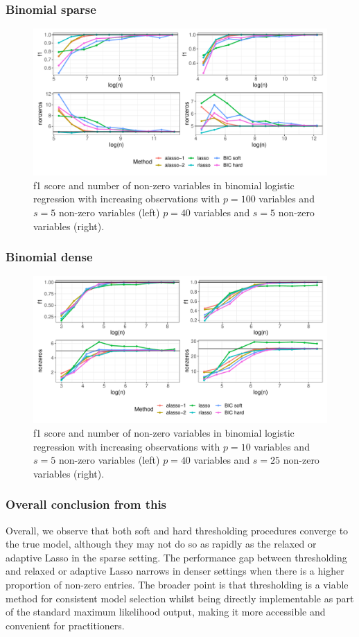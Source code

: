 \documentclass{beamer}
\begin{document}
\begin{frame}
  \frametitle{Binomial sparse}
  \begin{figure}[h!]
    \centering
    \includegraphics[scale=0.4]{binomial_sparse.pdf}
    \caption{{\footnotesize f1 score and number of non-zero variables in binomial logistic regression with increasing observations with $p=100$ variables and $s=5$ non-zero variables (left) $p=40$ variables and $s=5$ non-zero variables (right).}}
  \end{figure}


\end{frame}

\begin{frame}
  \frametitle{Binomial dense}
  \begin{figure}[h!]
    \centering
    \includegraphics[scale=0.4]{binomial_dense.pdf}
      \caption{{\footnotesize f1 score and number of non-zero variables in binomial logistic regression with increasing observations with $p=10$ variables and $s=5$ non-zero variables (left) $p=40$ variables and $s=25$ non-zero variables (right).}}
  \end{figure}
\end{frame}

\begin{frame}
  \frametitle{Overall conclusion from this}
  Overall, we observe that both soft and hard thresholding procedures converge to the true model, although they may not do so as rapidly as the relaxed or adaptive Lasso in the sparse setting. The performance gap between thresholding and relaxed or adaptive Lasso narrows in denser settings when there is a higher proportion of non-zero entries. The broader point is that thresholding is a viable method for consistent model selection whilst being directly implementable as part of the standard maximum likelihood output, making it more accessible and convenient for practitioners.
\end{frame}
\end{document}
